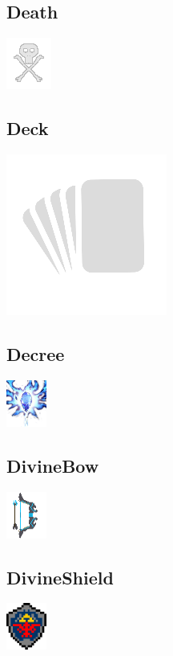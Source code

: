 \documentclass[a4paper,12pt]{scrartcl}
\begin{document}
	\subsection{Death}
	\begin{center}\includegraphics{Prog2_EA_V2/Art/Death.png}\end{center}
	\subsection{Deck}
	\begin{center}\includegraphics{Prog2_EA_V2/Art/deck.png}\end{center}
	\subsection{Decree}
	\begin{center}\includegraphics{Prog2_EA_V2/Art/Decree.png}\end{center}
	\subsection{DivineBow}
	\begin{center}\includegraphics{Prog2_EA_V2/Art/DivineBow.png}\end{center}
	\subsection{DivineShield}
	\begin{center}\includegraphics{Prog2_EA_V2/Art/DivineShield.png}\end{center}
\end{document}
